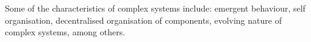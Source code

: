 \documentclass[10pt,a4paper]{article}
\begin{document}
Some of the characteristics of complex systems include: emergent behaviour, self organisation, decentralised organisation of components, evolving nature of complex systems, among others.

%	
%	
%	
%	
%	
%	
%	
\end{document}

